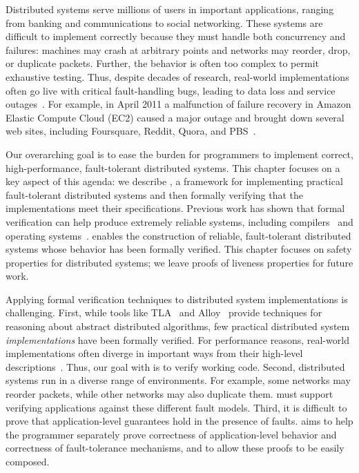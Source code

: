 Distributed systems serve millions of users in important applications,
ranging from banking and communications to social networking.
%
These systems are difficult to implement correctly because they
must handle both concurrency and failures: machines may
crash at arbitrary points and networks may reorder, drop, or duplicate packets.
Further, the behavior is often too complex to permit exhaustive testing.
%
Thus, despite decades of research,
real-world implementations
often go live with critical fault-handling bugs, leading to data loss and
service outages~\cite{yuan:aspirator,guo:fail-recover}.
%
For example, in April 2011 a malfunction of failure recovery in Amazon
Elastic Compute Cloud (EC2) caused a major outage and brought down several
web sites, including \mbox{Foursquare}, \mbox{Reddit}, \mbox{Quora},
and \mbox{PBS}~\cite{amazon:apr11-outage,lohr:amazon-apr11,highscalability}.

Our overarching goal is to ease the burden for programmers to
implement correct, high-performance, fault-tolerant distributed systems.
%
This chapter focuses on a key aspect of this agenda:
we describe \Verdi, a framework
for implementing practical fault-tolerant distributed systems and then
formally verifying that the implementations meet their
specifications.
%
Previous work has shown that formal verification can help produce extremely
reliable systems, including compilers~\cite{yang:csmith} and
operating systems~\cite{sel4:CACM10,yang:verve}.
%
\Verdi enables the construction of reliable, fault-tolerant distributed
systems whose behavior has been formally verified.
%
This chapter focuses on safety properties for distributed systems;
we leave proofs of liveness properties for future work.


Applying formal verification techniques to distributed system
implementations is challenging.
%
First, while tools like TLA~\cite{lamport:tla,lamport:specifying-systems} and
Alloy~\cite{jackson:alloy} provide techniques for reasoning about
abstract distributed algorithms, few practical distributed
system \textit{implementations}
have been formally verified.
%
For performance reasons, real-world implementations often diverge
in important ways from their high-level
descriptions~\cite{chandra:paxos-made-live}.
Thus, our goal with \Verdi is to verify working code.
%
Second, distributed systems run in a diverse range of environments. For
example, some networks may reorder packets, while other networks may also
duplicate them. \Verdi must support verifying applications against these
different fault models.
%
Third, it is difficult to prove that application-level guarantees hold in
the presence of faults. \Verdi aims to help the programmer separately prove
correctness of application-level behavior and correctness of
fault-tolerance mechanisms, and to allow these proofs to be easily composed.

